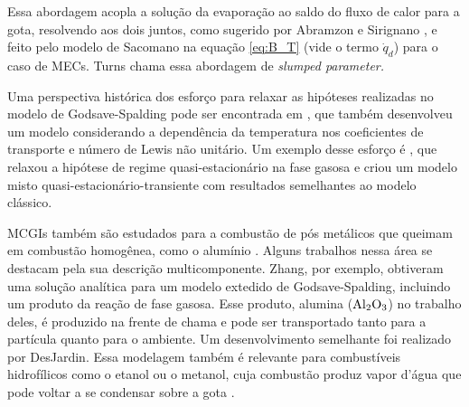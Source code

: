 Essa abordagem acopla a solução da evaporação ao saldo do fluxo de calor para a gota, resolvendo aos dois juntos, como sugerido por Abramzon e Sirignano \cite{Sirignano1989}, e feito pelo modelo de Sacomano\etal \cite{SacomanoF2022IJHMT} na equação \eqref{eq:B_T} (vide o termo $\dot q_d$) para o caso de MECs.
Turns \cite{Turns2000} chama essa abordagem de \emph{slumped parameter.}

Uma perspectiva histórica dos esforço para relaxar as hipóteses realizadas no modelo de Godsave-Spalding pode ser encontrada em \cite{FachiniF1999}, que também desenvolveu um modelo considerando a dependência da temperatura nos coeficientes de transporte e número de Lewis não unitário.
Um exemplo desse esforço é \cite{UlzamaS2007}, que relaxou a hipótese de regime quasi-estacionário na fase gasosa e criou um modelo misto quasi-estacionário-transiente com resultados semelhantes ao modelo clássico.

MCGIs também são estudados para a combustão de pós metálicos que queimam em combustão homogênea, como o alumínio \cite[p. 7]{Bergthorson2015}.
Alguns trabalhos nessa área se destacam pela sua descrição multicomponente. 
Zhang\etal \cite{Zhang2022_Coflow,Zhang2022_Counterflow}, por exemplo, obtiveram uma solução analítica para um modelo extedido de Godsave-Spalding, incluindo um produto da reação de fase gasosa.
Esse produto, alumina ($\mathrm{Al}_2 \mathrm{O}_3$) no trabalho deles, é produzido na frente de chama e pode ser transportado tanto para a partícula quanto para o ambiente.
Um desenvolvimento semelhante foi realizado por DesJardin\etal \cite{DesJardin2005}.
Essa modelagem também é relevante para combustíveis hidrofílicos como o etanol ou o metanol, cuja combustão produz vapor d'água que pode voltar a se condensar sobre a  gota \cite{SacomanoF2024CF,SacomanoF2025CF}.



